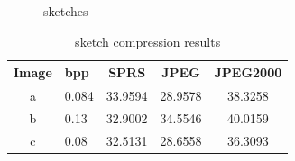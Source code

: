 \begin{figure}[h]
\centering
\setcounter{subfigure}{0}
\hspace{5mm}
\hspace{5mm}
\hspace{5mm}
\caption{sketches}
\label{fig:sketches}
\end{figure}


\begin{table}[h]
\centering
\begin{tabular}{| c l | c | c | c|}
\hline\hline
Image & bpp & SPRS & JPEG & JPEG2000 \\
\hline
a & 0.084 & 33.9594 & 28.9578 & 38.3258  \\
b & 0.13 & 32.9002 & 34.5546 &  40.0159 \\
c & 0.08 & 32.5131 & 28.6558 & 36.3093  \\
\hline
\end{tabular}
\caption{sketch compression results}
\label{tab:compression2}
\end{table}

